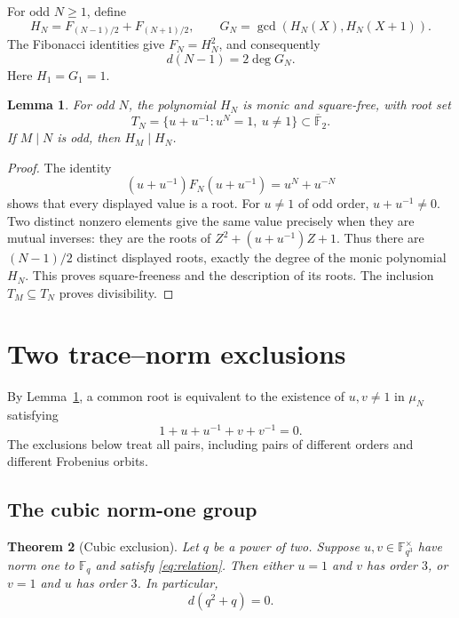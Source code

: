 \documentclass[a4paper]{article}
\newtheorem{theorem}{Theorem}[section]
\newtheorem{lemma}[theorem]{Lemma}
\newcommand{\F}{\mathbb F}
\begin{document}
For odd $N\geq1$, define
\[
 H_N=F_{(N-1)/2}+F_{(N+1)/2},\qquad
 G_N=\gcd(H_N(X),H_N(X+1)).
\]
The Fibonacci identities give $F_N=H_N^2$, and consequently
\begin{equation}\label{eq:half-nullity}
 d(N-1)=2\deg G_N.
\end{equation}
Here $H_1=G_1=1$.

\begin{lemma}\label{lem:roots}
For odd $N$, the polynomial $H_N$ is monic and square-free, with root set
\[
 T_N=\{u+u^{-1}:u^N=1,\ u\ne1\}\subset\overline{\F}_2.
\]
If $M\mid N$ is odd, then $H_M\mid H_N$.
\end{lemma}

\begin{proof}
The identity
\[
 (u+u^{-1})F_N(u+u^{-1})=u^N+u^{-N}
\]
shows that every displayed value is a root.  For $u\ne1$ of odd order,
$u+u^{-1}\ne0$.  Two distinct nonzero elements give the same value precisely
when they are mutual inverses: they are the roots of
$Z^2+(u+u^{-1})Z+1$.
Thus there are $(N-1)/2$ distinct displayed roots, exactly the degree
of the monic polynomial $H_N$.  This proves square-freeness and the
description of its roots.  The inclusion $T_M\subseteq T_N$ proves
divisibility.
\end{proof}

\section{Two trace--norm exclusions}\label{sec:norms}

By Lemma~\ref{lem:roots}, a common root is equivalent to the existence
of $u,v\ne1$ in $\mu_N$ satisfying
\begin{equation}\label{eq:relation}
 1+u+u^{-1}+v+v^{-1}=0.
\end{equation}
The exclusions below treat all pairs, including pairs of different
orders and different Frobenius orbits.

\subsection{The cubic norm-one group}

\begin{theorem}[Cubic exclusion]\label{thm:cubic}
Let $q$ be a power of two.  Suppose $u,v\in\F_{q^3}^{\times}$ have
norm one to $\F_q$ and satisfy \eqref{eq:relation}.
Then either $u=1$ and $v$ has order $3$, or $v=1$ and $u$ has
order $3$.  In particular,
\begin{equation}\label{eq:cubic-nullity}
 d(q^2+q)=0.
\end{equation}
\end{theorem}
\end{document}
